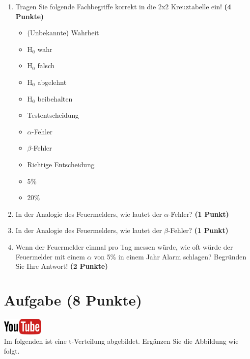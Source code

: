 \documentclass[a4paper, 10pt]{scrartcl}\usepackage[]{graphicx}\usepackage[]{xcolor}
\begin{document}
\begin{enumerate}
\item Tragen Sie folgende Fachbegriffe korrekt in die 2x2 Kreuztabelle ein! \textbf{(4 Punkte)}
  \begin{itemize}
  \item (Unbekannte) Wahrheit	
  \item H$_0$ wahr
  \item H$_0$ falsch
  \item H$_0$ abgelehnt
  \item H$_0$ beibehalten
  \item Testentscheidung
  \item $\alpha$-Fehler
  \item $\beta$-Fehler
  \item Richtige Entscheidung
  \item 5\%
  \item 20\%
  \end{itemize}
\item In der Analogie des Feuermelders, wie lautet der $\alpha$-Fehler? \textbf{(1 Punkt)}
\item In der Analogie des Feuermelders, wie lautet der $\beta$-Fehler? \textbf{(1 Punkt)}
\item Wenn der Feuermelder einmal pro Tag messen w{\"u}rde, wie oft w{\"u}rde der
  Feuermelder mit einem $\alpha$ von 5\% in einem Jahr Alarm schlagen?
  Begr{\"u}nden Sie Ihre Antwort! \textbf{(2 Punkte)}
\end{enumerate}



 
\clearpage

\section{Aufgabe \hfill (8 Punkte)}

\hfill\href{https://youtu.be/32JjH1eyuTU}{\includegraphics[width =
  2cm]{img/youtube}}\\[1Ex]



Im folgenden ist eine t-Verteilung abgebildet. Erg{\"a}nzen Sie die Abbildung wie folgt.
\end{document}
